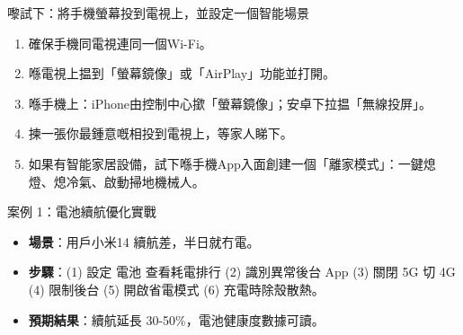 \begin{tcbpractice}{嚟試下：將手機螢幕投到電視上，並設定一個智能場景}
\begin{enumerate}
  \item 確保手機同電視連同一個Wi-Fi。
  \item 喺電視上揾到「螢幕鏡像」或「AirPlay」功能並打開。
  \item 喺手機上：iPhone由控制中心撳「螢幕鏡像」；安卓下拉揾「無線投屏」。
  \item 揀一張你最鍾意嘅相投到電視上，等家人睇下。
  \item 如果有智能家居設備，試下喺手機App入面創建一個「離家模式」：一鍵熄燈、熄冷氣、啟動掃地機械人。
\end{enumerate}

\end{tcbpractice}

\begin{tcbinfo}{案例 1：電池續航優化實戰}
\begin{itemize}
  \item \textbf{場景}：用戶小米14 續航差，半日就冇電。
  \item \textbf{步驟}：(1) 設定 電池 查看耗電排行 (2) 識別異常後台 App (3) 關閉 5G 切 4G (4) 限制後台 (5) 開啟省電模式 (6) 充電時除殼散熱。
  \item \textbf{預期結果}：續航延長 30-50\%，電池健康度數據可讀。
\end{itemize}

\end{tcbinfo}
